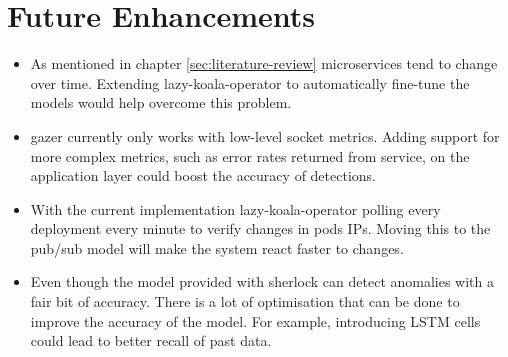 \section{Future Enhancements}

\begin{itemize}[noitemsep,nolistsep]
    \item As mentioned in chapter \ref{sec:literature-review} microservices tend to change over time. Extending \ac{lazy-koala-operator} to automatically fine-tune the models would help overcome this problem.
    \item \ac{gazer} currently only works with low-level socket metrics. Adding support for more complex metrics, such as error rates returned from service, on the application layer could boost the accuracy of detections.
    \item With the current implementation \ac{lazy-koala-operator} polling every deployment every minute to verify changes in pods IPs. Moving this to the pub/sub model will make the system react faster to changes.
    \item Even though the model provided with \ac{sherlock} can detect anomalies with a fair bit of accuracy. There is a lot of optimisation that can be done to improve the accuracy of the model. For example, introducing LSTM cells could lead to better recall of past data.
\end{itemize}